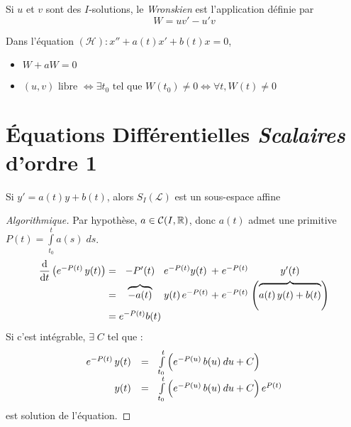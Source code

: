 \documentclass[11pt,a4paper,fleqn,pdftex]{report}
\begin{document}
\begin{dfn}[Wronskien]
    Si $u$ et $v$ sont des $I$-solutions, le \emph{Wronskien} est l'application définie par
    \begin{equation}
    W = uv' - u'v \tag{Wronskien}
    \end{equation}
\end{dfn}
\begin{prop}
Dans l'équation $(\mathcal{H}) : x'' + a(t)x' + b(t) x =0$,
\begin{itemize}
    \item $W + a W = 0$
    \item $(u,v)\text{ libre }\Leftrightarrow \exists t_0 \text{ tel que } W(t_0) \neq 0 \Leftrightarrow \forall t, W(t) \neq 0$
\end{itemize}
\end{prop}
\section{Équations Différentielles \emph{Scalaires} d'ordre 1}
\begin{theorem}
Si $y'=a(t) y + b(t)$, alors $S_I(\mathscr{L})$ est un sous-espace affine
\end{theorem}
\begin{proof}[Algorithmique]\label{ResolEquDiffScal1}
Par hypothèse, $a \in \mathcal{C}(I,\mathbb{R}{})$, donc $a(t)$ admet une primitive $P(t)=\int \limits_{t_0}^t a(s) \; ds$.
\[\arraycolsep=1.4pt\def\arraystretch{1}
\begin{array}{r c c l l c c}
\dfrac{\d}{\d t}\left( e^{-P(t)}\, y(t) \right) &=& -P'(t) & e^{-P(t)}y(t) &+& e^{-P(t)}& y'(t)\\
&=& \overbrace{-a(t)}&y(t)\, e^{-P(t)}&+& e^{-P(t)} &\left( \overbrace{\vphantom{{3^3}^3} a(t)\, y(t) +b(t)} \right)\\
&=& e^{-P(t)}b(t)\\
\end{array}\]
Si c'est intégrable, $\exists \; C$ tel que :
\[
\begin{array}{r c l}
e^{-P(t)}\, y(t) &=& \int \limits_{t_0}^t \left( \vphantom{{3^3}^3} e^{-P(u)}\, b(u) \: du + C \right)\\
y(t) &=& \int\limits_{t_0}^t \left( \vphantom{{3^3}^3} e^{-P(u)}\, b(u) \: du + C \right) e^{P(t)}
\end{array}
\] est solution de l'équation.
\end{proof}
%
\end{document}
